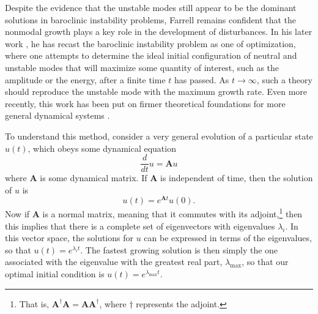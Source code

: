 \documentclass[letterpaper,11pt,onecolumn,twoside,titlepage]{article}
\begin{document}
Despite the evidence that the unstable modes still appear to be the dominant solutions in baroclinic instability problems, Farrell remains confident that the nonmodal growth plays a key role in the development of disturbances. In his later work \citep{Farrell:1989:Optimization}, he has recast the baroclinic instability problem as one of optimization, where one attempts to determine the ideal initial configuration of neutral and unstable modes that will maximize some quantity of interest, such as the amplitude or the energy, after a finite time $t$ has passed. As $t \rightarrow \infty$, such a theory should reproduce the unstable mode with the maximum growth rate. Even more recently, this work has been put on firmer theoretical foundations for more general dynamical systems \citep{Farrell+:1996:Stability1, Farrell+:1996:Stability2}.

To understand this method, consider a very general evolution of a particular state $u(t)$, which obeys some dynamical equation
\[
\frac{d}{dt} u = \mathbf{A} u
\]
where $\mathbf{A}$ is some dynamical matrix. If $\mathbf{A}$ is independent of time, then the solution of $u$ is
\[
u(t) = e^{\mathbf{A} t} u(0).
\]
Now if $\mathbf{A}$ is a normal matrix, meaning that it commutes with its adjoint,\footnote{That is, $\mathbf{A}^\dag \mathbf{A} = \mathbf{A} \mathbf{A}^\dag$, where $\dag$ represents the adjoint.} then this implies that there is a complete set of eigenvectors with eigenvalues $\lambda_i$. In this vector space, the solutions for $u$ can be expressed in terms of the eigenvalues, so that $u(t) = e^{\lambda_i t}$. The fastest growing solution is then simply the one associated with the eigenvalue with the greatest real part, $\lambda_\text{max}$, so that our optimal initial condition is $u(t) = e^{\lambda_\text{max} t}$.
\end{document}
